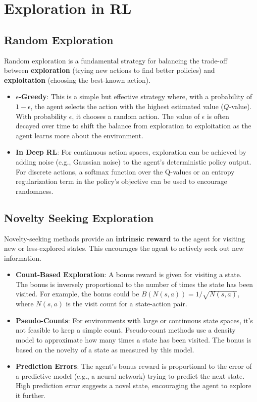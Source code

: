 \documentclass[12pt]{article}
\begin{document}
\section{Exploration in RL }

\subsection{Random Exploration}
Random exploration is a fundamental strategy for balancing the trade-off between \textbf{exploration} (trying new actions to find better policies) and \textbf{exploitation} (choosing the best-known action).
\begin{itemize}
    \item \textbf{$\epsilon$-Greedy}: This is a simple but effective strategy where, with a probability of $1 - \epsilon$, the agent selects the action with the highest estimated value ($Q$-value). With probability $\epsilon$, it chooses a random action. The value of $\epsilon$ is often decayed over time to shift the balance from exploration to exploitation as the agent learns more about the environment.
    \item \textbf{In Deep RL}: For continuous action spaces, exploration can be achieved by adding noise (e.g., Gaussian noise) to the agent's deterministic policy output. For discrete actions, a softmax function over the Q-values or an entropy regularization term in the policy's objective can be used to encourage randomness.
\end{itemize}

\subsection{Novelty Seeking Exploration}
Novelty-seeking methods provide an \textbf{intrinsic reward} to the agent for visiting new or less-explored states. This encourages the agent to actively seek out new information.
\begin{itemize}
    \item \textbf{Count-Based Exploration}: A bonus reward is given for visiting a state. The bonus is inversely proportional to the number of times the state has been visited. For example, the bonus could be $B(N(s, a)) = 1/\sqrt{N(s, a)}$, where $N(s, a)$ is the visit count for a state-action pair.
    \item \textbf{Pseudo-Counts}: For environments with large or continuous state spaces, it's not feasible to keep a simple count. Pseudo-count methods use a density model to approximate how many times a state has been visited. The bonus is based on the novelty of a state as measured by this model.
    \item \textbf{Prediction Errors}: The agent's bonus reward is proportional to the error of a predictive model (e.g., a neural network) trying to predict the next state. High prediction error suggests a novel state, encouraging the agent to explore it further.
\end{itemize}
\end{document}
